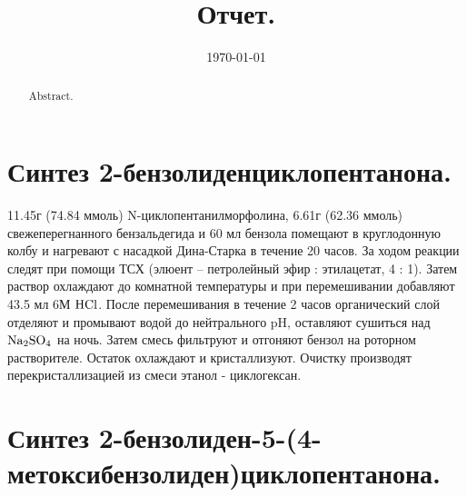 \documentclass[a4paper]{article}
\title{Отчет.}
\date{\today}
\begin{document}
\maketitle

\begin{abstract}
Abstract.
\end{abstract}

\section*{Синтез 2-бензолиденциклопентанона.}
11.45г (74.84 ммоль) N-циклопентанилморфолина, 6.61г (62.36 ммоль) свежеперегнанного бензальдегида и 60 мл бензола помещают в круглодонную колбу и нагревают с насадкой Дина-Старка в течение 20 часов. За ходом реакции следят при помощи ТСХ (элюент -- петролейный эфир : этилацетат, 4 : 1).
Затем раствор охлаждают до комнатной температуры и при перемешивании добавляют 43.5 мл 6М $\ce{HCl}$. После перемешивания в течение 2 часов органический слой отделяют и промывают водой до нейтрального pH, оставляют сушиться над $\ce{Na2SO4}$ на ночь. Затем смесь фильтруют и отгоняют бензол на роторном растворителе. Остаток охлаждают и кристаллизуют. Очистку производят перекристаллизацией из смеси этанол - циклогексан.

\section*{Синтез 2-бензолиден-5-(4-метоксибензолиден)циклопентанона.}
\end{document}
